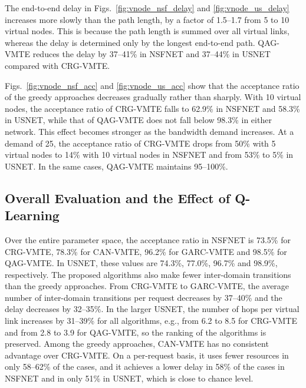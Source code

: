 The end-to-end delay in Figs.~\ref{fig:vnode_nsf_delay} and \ref{fig:vnode_us_delay} increases more slowly than the path length, by a factor of 1.5--1.7 from 5 to 10 virtual nodes. This is because the path length is summed over all virtual links, whereas the delay is determined only by the longest end-to-end path. QAG-VMTE reduces the delay by 37--41\% in NSFNET and 37--44\% in USNET compared with CRG-VMTE.

Figs.~\ref{fig:vnode_nsf_acc} and \ref{fig:vnode_us_acc} show that the acceptance ratio of the greedy approaches decreases gradually rather than sharply. With 10 virtual nodes, the acceptance ratio of CRG-VMTE falls to 62.9\% in NSFNET and 58.3\% in USNET, while that of QAG-VMTE does not fall below 98.3\% in either network. This effect becomes stronger as the bandwidth demand increases. At a demand of 25, the acceptance ratio of CRG-VMTE drops from 50\% with 5 virtual nodes to 14\% with 10 virtual nodes in NSFNET and from 53\% to 5\% in USNET. In the same cases, QAG-VMTE maintains 95--100\%.

\subsection{Overall Evaluation and the Effect of Q-Learning}
\label{subsec:overall}

Over the entire parameter space, the acceptance ratio in NSFNET is 73.5\% for CRG-VMTE, 78.3\% for CAN-VMTE, 96.2\% for GARC-VMTE and 98.5\% for QAG-VMTE. In USNET, these values are 74.3\%, 77.0\%, 96.7\% and 98.9\%, respectively. The proposed algorithms also make fewer inter-domain transitions than the greedy approaches. From CRG-VMTE to GARC-VMTE, the average number of inter-domain transitions per request decreases by 37--40\% and the delay decreases by 32--35\%. In the larger USNET, the number of hops per virtual link increases by 31--39\% for all algorithms, e.g., from 6.2 to 8.5 for CRG-VMTE and from 2.8 to 3.9 for QAG-VMTE, so the ranking of the algorithms is preserved. Among the greedy approaches, CAN-VMTE has no consistent advantage over CRG-VMTE. On a per-request basis, it uses fewer resources in only 58--62\% of the cases, and it achieves a lower delay in 58\% of the cases in NSFNET and in only 51\% in USNET, which is close to chance level.

